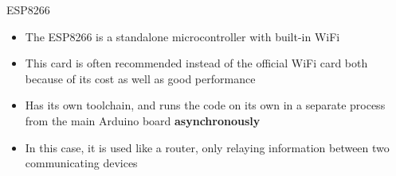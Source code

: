 \documentclass[12pt]{beamer}
\begin{document}
\begin{frame}{ESP8266}
  \begin{itemize}
    \item<+-> The ESP8266 is a standalone microcontroller with built-in WiFi \cite{ESP8266}
    \item<+-> This card is often recommended instead of the official WiFi card both because of its cost as well as good performance
    \item<+-> Has its own toolchain, and runs the code on its own in a separate process from the main Arduino board \textbf{asynchronously}
    \item<+-> In this case, it is used like a router, only relaying information between two communicating devices
  \end{itemize}
\end{frame}
\end{document}

